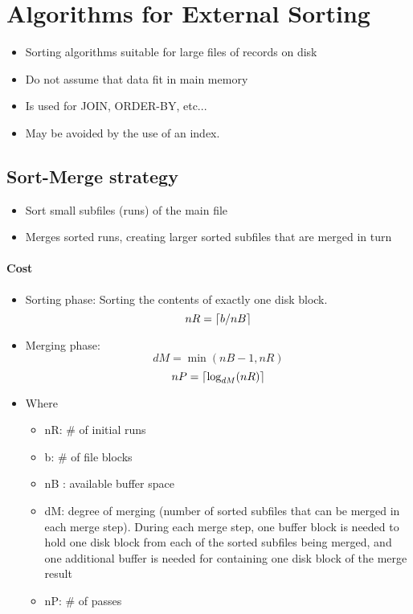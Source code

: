 
\section{Algorithms for External Sorting}
\begin{itemize}
    \item Sorting algorithms suitable for large files of records on disk
    \item Do not assume that data fit in main memory
    \item Is used for JOIN, ORDER-BY, etc...
    \item May be avoided by the use of an index.
\end{itemize}

\subsection{Sort-Merge strategy}
\begin{itemize}
    \item Sort small subfiles (runs) of the main file
    \item Merges sorted runs, creating larger sorted subfiles that are merged in turn
\end{itemize} 

\paragraph{Cost}
\begin{itemize}
    \item Sorting phase: Sorting the contents of exactly one disk block. $$nR = \lceil b/nB\rceil$$
    \item Merging phase: 
    $$dM = \min{(nB-1,nR)}$$
    $$nP= \lceil\log_{dM}(nR)\rceil$$
    \item Where \begin{itemize}
        \item nR: \# of initial runs
        \item b: \# of file blocks
        \item nB : available buffer space
        \item dM: degree of merging (number of sorted subfiles that can be merged in each merge step). During each merge step, one buffer block is needed to hold one disk block from each of the sorted subfiles being merged, and one additional buffer is needed for containing one disk block of the merge result
        \item nP: \# of passes
    \end{itemize}
\end{itemize}

